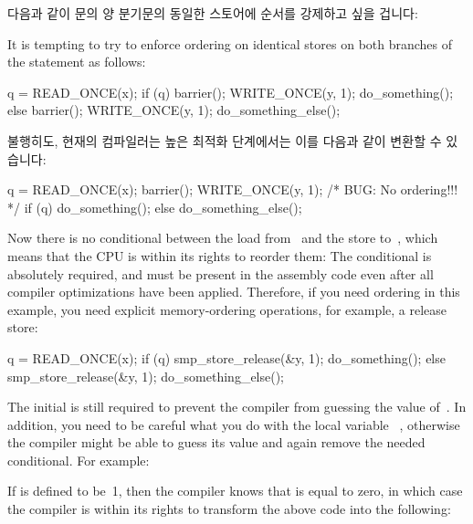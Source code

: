다음과 같이  문의 양 분기문의 동일한 스토어에 순서를 강제하고 싶을
겁니다:

It is tempting to try to enforce ordering on identical stores on both
branches of the  statement as follows:

\begin{VerbatimN}
q = READ_ONCE(x);
if (q) {
	barrier();
	WRITE_ONCE(y, 1);
	do_something();
} else {
	barrier();
	WRITE_ONCE(y, 1);
	do_something_else();
}
\end{VerbatimN}

불행히도, 현재의 컴파일러는 높은 최적화 단계에서는 이를 다음과 같이 변환할 수
있습니다:

\begin{VerbatimN}
q = READ_ONCE(x);
barrier();
WRITE_ONCE(y, 1);  /* BUG: No ordering!!! */
if (q)
	do_something();
else
	do_something_else();
\end{VerbatimN}

Now there is no conditional between the load from~ and the store
to~, which means that the CPU is within its rights to reorder them:
The conditional is absolutely required, and must be present in the
assembly code even after all compiler optimizations have been applied.
Therefore, if you need ordering in this example, you need explicit
memory-ordering operations, for example, a release store:

\begin{VerbatimN}
q = READ_ONCE(x);
if (q) {
	smp_store_release(&y, 1);
	do_something();
} else {
	smp_store_release(&y, 1);
	do_something_else();
}
\end{VerbatimN}

The initial  is still required to prevent the compiler from
guessing the value of~.
In addition, you need to be careful what you do with the local variable~%
,
otherwise the compiler might be able to guess its value and again remove
the needed conditional.
For example:


If  is defined to be~1, then the compiler knows that  is
equal to zero, in which case the compiler is within its rights to
transform the above code into the following:

